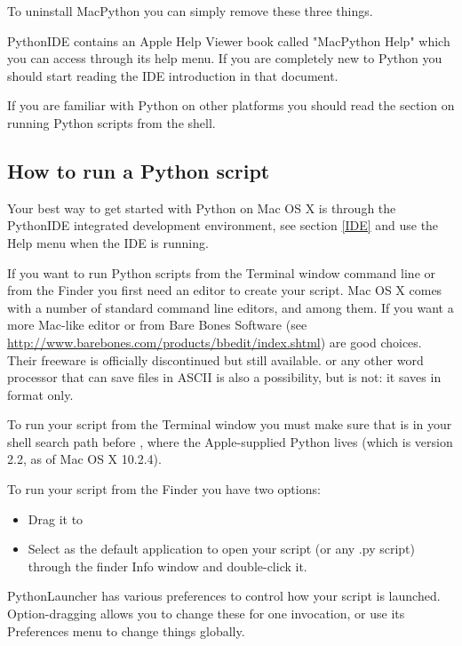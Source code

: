 To uninstall MacPython you can simply remove these three things.

PythonIDE contains an Apple Help Viewer book called "MacPython Help"
which you can access through its help menu. If you are completely new to
Python you should start reading the IDE introduction in that document.

If you are familiar with Python on other \UNIX{} platforms you should
read the section on running Python scripts from the \UNIX{} shell.

\subsection{How to run a Python script}

Your best way to get started with Python on Mac OS X is through the PythonIDE
integrated development environment, see section \ref{IDE} and use the Help
menu when the IDE is running.

If you want to run Python scripts from the Terminal window command line
or from the Finder you first need an editor to create your script.
Mac OS X comes with a number of standard \UNIX{} command line editors,
 and  among them. If you want a more Mac-like
editor  or  from Bare Bones Software
(see \url{http://www.barebones.com/products/bbedit/index.shtml}) are
good choices.  Their freeware  is officially
discontinued but still available.   or any other
word processor that can save files in ASCII is also a possibility, but
 is not: it saves in  format only.

To run your script from the Terminal window you must make sure that
 is in your shell search path before ,
where the Apple-supplied Python lives (which is version 2.2, as of Mac OS X
10.2.4). 

To run your script from the Finder you have two options:
\begin{itemize}
    \item Drag it to 
    \item Select  as the default application
    to open your script (or any .py script) through the finder Info window
    and double-click it.
\end{itemize}

PythonLauncher has various preferences to control how your script is launched.
Option-dragging allows you to change these for one invocation, or use its
Preferences menu to change things globally.

